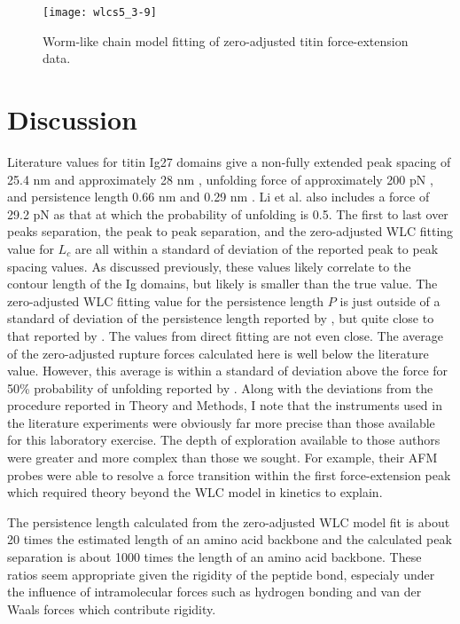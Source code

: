 \documentclass{article}
\begin{document}
\begin{figure}[H]
\texttt{[image: wlcs5\_3-9]}
\centering
\caption{Worm-like chain model fitting of zero-adjusted titin force-extension data.}
\end{figure}

\section{Discussion}

Literature values for titin Ig27 domains give a non-fully extended peak spacing
of 25.4 nm \cite{biophysics} and approximately 28 nm \cite{nature}, unfolding force of
approximately 200 pN \cite{nature}\cite{biophysics}, and persistence
length 0.66 nm \cite{nature} and 0.29 nm \cite{biophysics}. Li et al. also includes a force of
29.2 pN as that at which the probability of unfolding  is 0.5.
The first to last over peaks separation, the peak to peak separation, and the zero-adjusted
WLC fitting value for $L_c$ are all within a standard of deviation of the reported peak to peak
spacing values. As discussed previously, these values likely correlate to the contour length
of the Ig domains, but likely is smaller than the true value.
The zero-adjusted WLC fitting value for the persistence length $P$ is just outside of a 
standard of deviation of the persistence length reported by \cite{biophysics}, but quite close
to that reported by \cite{nature}. The values from direct fitting are not even close.
The average of the zero-adjusted rupture forces calculated here is well below the literature 
value. However, this average is within a standard of deviation above the force for 50\%
probability of unfolding reported by \cite{nature}.
Along with the deviations from the procedure reported in Theory and Methods, I note
that the instruments used in the literature experiments were obviously far more precise
than those available for this laboratory exercise. The depth of exploration available
to those authors were greater and more complex than those we sought. For example,
their AFM probes were able to resolve a force transition within the first force-extension
peak which required theory beyond the WLC model in kinetics to explain.

The persistence length calculated from the zero-adjusted WLC model fit is about 20 times
the estimated length of an amino acid backbone and the calculated peak separation
is about 1000 times the length of an amino acid backbone. These ratios seem appropriate 
given the rigidity of the peptide bond, especialy under the influence of intramolecular forces
such as hydrogen bonding and van der Waals forces which contribute rigidity.
\end{document}
